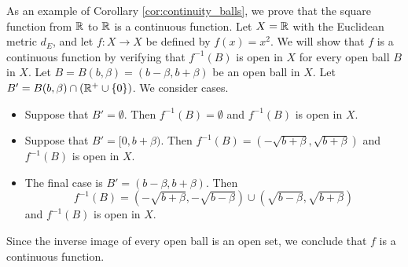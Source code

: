 \begin{comment}

\ActivitySolution

\ba

\item Since $B$ is an open set and $f$ is continuous, Theorem shows that $f^{-1}(B)$ is an open set in $X$.

\item 
	\begin{enumerate}[i.]
	\item Theorem \ref{thm:OS_1} tells us that $O = \bigcup_{t \in I}B(t, \alpha_t)$ is a union of open balls in $Y$ for $t$ in some indexing set $I$. 
	
	\item By Lemma \ref{lem:functions_subsets} we have 
\[f^{-1}(O) = f^{-1}\left( \bigcup_{t \in I} B(t, \alpha_t) \right) = \bigcup_{t \in I} f^{-1}(B(t, \alpha_t)).\]
By hypothesis, $f^{-1}(B(t, \alpha_t)$ is an open set in $X$. Therefore, $f^{-1}(O)$ is a union of open sets in $X$ and so $f^{-1}(O)$ is open in $X$. We conclude that $f$ is a continuous function. 

	\end{enumerate}

\ea

\end{comment}

\begin{example} \label{exp:linear_continuous}  As an example of Corollary \ref{cor:continuity_balls}, we prove that the square function from $\mathbb{R}$ to $\mathbb{R}$ is a continuous function. Let $X = \mathbb{R}$ with the Euclidean metric $d_E$, and let $f: X \to X$ be defined by $f(x) = x^2$. We will show that $f$ is a continuous function by verifying that $f^{-1}(B)$ is open in $X$ for every open ball $B$ in $X$. Let $B = B(b,\beta) = (b-\beta, b+\beta)$ be an open ball in $X$. Let $B' = B(b,\beta) \cap (\mathbb{R}^+ \cup \{0\})$. We consider cases.
\begin{itemize}
\item Suppose that $B' = \emptyset$. Then $f^{-1}(B) = \emptyset$ and $f^{-1}(B)$ is open in $X$.  
\item Suppose that $B' = [0, b+\beta)$. Then $f^{-1}(B) = (-\sqrt{b+\beta}, \sqrt{b+\beta})$ and $f^{-1}(B)$ is open in $X$. 
\item The final case is $B' = (b-\beta, b+\beta)$. Then 
\[f^{-1}(B) = (-\sqrt{b+\beta}, -\sqrt{b-\beta}) \cup (\sqrt{b-\beta}, \sqrt{b+\beta})\]
and $f^{-1}(B)$ is open in $X$. \end{itemize}
Since the inverse image of every open ball is an open set, we conclude that $f$ is a continuous function.
\end{example}


